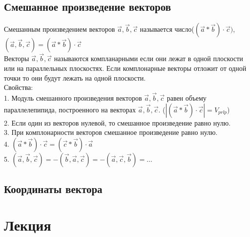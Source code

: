 \documentclass[a4paper, 12pt]{article}
\begin{document}
\subsection{Смешанное произведение векторов}

Смешанным произведением векторов $ \vec{a},\vec{b},\vec{c} $ называется число($ (\vec{a}*\vec{b})\cdot \vec{c}) $, $ (\vec{a},\vec{b},\vec{c}) = (\vec{a}*\vec{b})\cdot \vec{c} $\\

Векторы $  \vec{a},\vec{b},\vec{c} $ называются компланарными если они лежат в одной плоскости или на параллельных плоскостях. Если комплонарные векторы отложит от одной точки то они будут лежать на одной плоскости.\\

Свойства:\\
1. Модуль смешанного произведения векторов $  \vec{a},\vec{b},\vec{c} $ равен объему параллелепипида, построенного на векторах $  \vec{a},\vec{b},\vec{c} $. ($  |(\vec{a}*\vec{b})\cdot\vec{c}|  = V_{prlp} $)\\
2. Если один из векторов нулевой, то смешанное произведение равно нулю. \\
3. При комплонарности векторов смешанное произведение равно нулю.\\
4. $ (\vec{a}*\vec{b})\cdot\vec{c} = (\vec{c}*\vec{b})\cdot\vec{a} $\\
5. $ (\vec{a},\vec{b},\vec{c}) =  -(\vec{b},\vec{a},\vec{c}) = -(\vec{a},\vec{c},\vec{b}) = \ldots $

\subsection{Координаты вектора}










\section{Лекция}
\subsection{}






\newpage
\end{document}

